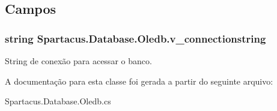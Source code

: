\subsection{Campos}
\hypertarget{classSpartacus_1_1Database_1_1Oledb_a7bfa2fa4427cb9a5ae00fc0e58562ece}{
\subsubsection[{v\+\_\+connectionstring}]{\setlength{\rightskip}{0pt plus 5cm}string Spartacus.\+Database.\+Oledb.\+v\+\_\+connectionstring}}\label{classSpartacus_1_1Database_1_1Oledb_a7bfa2fa4427cb9a5ae00fc0e58562ece}


String de conexão para acessar o banco. 



A documentação para esta classe foi gerada a partir do seguinte arquivo\+:\begin{DoxyCompactItemize}
\item 
Spartacus.\+Database.\+Oledb.\+cs\end{DoxyCompactItemize}
